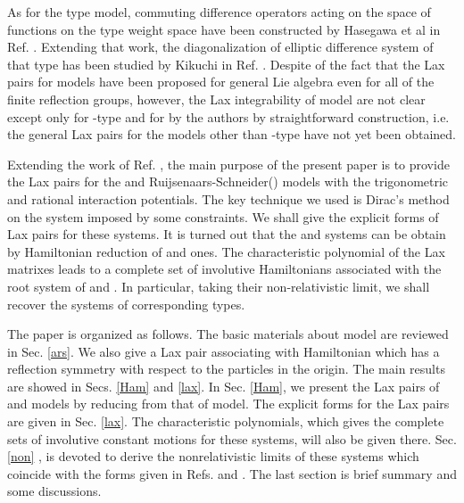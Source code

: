 \documentclass[a4paper,12pt]{article}
\begin{document}
As for the \coordHE{} type \coordHE{} model, commuting difference operators acting on
the space of functions on the \coordHE{} type weight space have been
constructed by Hasegawa et al in Ref. \cite{h2}. Extending that work, the
diagonalization of elliptic difference system of that type has been studied
by Kikuchi in Ref. \cite{ki}. Despite of the fact that the Lax pairs for \coordHE{}
models have been proposed for general Lie algebra even for all of the finite
reflection groups\cite{bcs1}, however, the Lax integrability of \coordHE{} model are
not clear except only for \coordHE{} -type\cite{r1, nksr, bc, kz, s1, s2} and
for \coordHE{} by the authors by straightforward construction\cite{kai3}, i.e.
the general Lax pairs for the \coordHE{} models other than \coordHE{} -type have not
yet been obtained.

Extending the work of Ref. \cite{kai3}, the main purpose of the present paper is
to provide the Lax pairs for the \coordHE{} and \coordHE{}
Ruijsenaars-Schneider(\coordHE{}) models with the trigonometric and rational
interaction potentials. The key technique we used is Dirac's method
on the system imposed by some constraints. We shall give the explicit forms of
Lax pairs for these systems. It is turned out that the \coordHE{} and \coordHE{}  \coordHE{} systems can be obtain by Hamiltonian reduction of \coordHE{} and \coordHE{}
ones. The characteristic polynomial of the Lax matrixes leads to a complete
set of involutive Hamiltonians associated with the root system of \coordHE{}
and \coordHE{}. In particular, taking their non-relativistic limit, we shall
recover the systems of corresponding \coordHE{} types.

The paper is organized as follows. The basic materials about \coordHE{}  \coordHE{}
model are reviewed in Sec. \ref{ars}. We also give a Lax pair associating
with Hamiltonian which has a reflection symmetry with respect to the
particles in the origin. The main results are showed in Secs. \ref{Ham} and
 \ref{lax}. In Sec. \ref{Ham}, we present the Lax pairs of \coordHE{} and
\coordHE{}  \coordHE{} models by reducing from that of \coordHE{}  \coordHE{} model. The
explicit forms for the Lax pairs are given in Sec. \ref{lax}. The
characteristic polynomials, which gives the complete sets of involutive
constant motions for these systems, will also be given there. Sec. \ref{non}%
, is devoted to derive the nonrelativistic limits of these systems which
coincide with the forms given in Refs. \cite{op} and \cite{bcs}. The last
section is brief summary and some discussions.
\end{document}
